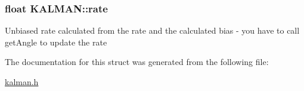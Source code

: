 \subsubsection[{\texorpdfstring{rate}{rate}}]{\setlength{\rightskip}{0pt plus 5cm}float K\+A\+L\+M\+A\+N\+::rate}\hypertarget{struct_k_a_l_m_a_n_a81faa619025b1fd34ecba15ffc858cf9}{}\label{struct_k_a_l_m_a_n_a81faa619025b1fd34ecba15ffc858cf9}
Unbiased rate calculated from the rate and the calculated bias -\/ you have to call get\+Angle to update the rate 

The documentation for this struct was generated from the following file\+:\begin{DoxyCompactItemize}
\item 
\hyperlink{kalman_8h}{kalman.\+h}\end{DoxyCompactItemize}
